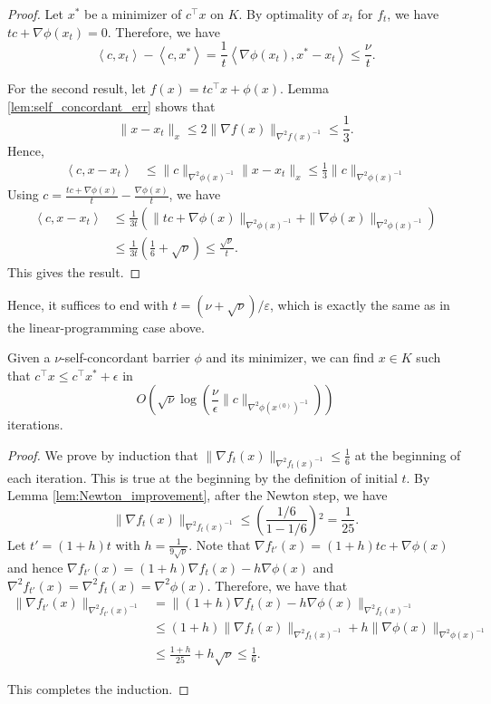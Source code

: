 \begin{proof}
Let $x^{*}$ be a minimizer of $c^{\top}x$ on $K$. By optimality
of $x_{t}$ for $f_{t}$, we have $tc+\nabla\phi(x_{t})=0$. Therefore,
we have 
\[
\left\langle c,x_{t}\right\rangle -\left\langle c,x^{*}\right\rangle =\frac{1}{t}\left\langle \nabla\phi(x_{t}),x^{*}-x_{t}\right\rangle \leq\frac{\nu}{t}.
\]

For the second result, let $f(x)=tc^{\top}x+\phi(x)$. Lemma \ref{lem:self_concordant_err}
shows that
\[
\|x-x_{t}\|_{x}\leq2\|\nabla f(x)\|_{\nabla^{2}f(x)^{-1}}\leq\frac{1}{3}.
\]
Hence,
\begin{align*}
\left\langle c,x-x_{t}\right\rangle  & \leq\|c\|_{\nabla^{2}\phi(x)^{-1}}\|x-x_{t}\|_{x}\leq\frac{1}{3}\|c\|_{\nabla^{2}\phi(x)^{-1}}
\end{align*}
Using $c=\frac{tc+\nabla\phi(x)}{t}-\frac{\nabla\phi(x)}{t}$, we
have
\begin{align*}
\left\langle c,x-x_{t}\right\rangle  & \leq\frac{1}{3t}\left(\|tc+\nabla\phi(x)\|_{\nabla^{2}\phi(x)^{-1}}+\|\nabla\phi(x)\|_{\nabla^{2}\phi(x)^{-1}}\right)\\
 & \leq\frac{1}{3t}\left(\frac{1}{6}+\sqrt{\nu}\right)\leq\frac{\sqrt{\nu}}{t}.
\end{align*}
This gives the result.
\end{proof}
Hence, it suffices to end with $t=(\nu+\sqrt{\nu})/\varepsilon$,
which is exactly the same as in the linear-programming case above.
\begin{thm}
Given a $\nu$-self-concordant barrier $\phi$ and its minimizer,
we can find $x\in K$ such that $c^{\top}x\leq c^{\top}x^{*}+\epsilon$
in 
\[
O(\sqrt{\nu}\log(\frac{\nu}{\epsilon}\|c\|_{\nabla^{2}\phi(x^{(0)})^{-1}}))
\]
iterations.
\end{thm}

\begin{proof}
We prove by induction that $\|\nabla f_{t}(x)\|_{\nabla^{2}f_{t}(x)^{-1}}\leq\frac{1}{6}$
at the beginning of each iteration. This is true at the beginning
by the definition of initial $t$. By Lemma \ref{lem:Newton_improvement},
after the Newton step, we have
\[
\|\nabla f_{t}(x)\|_{\nabla^{2}f_{t}(x)^{-1}}\leq\left(\frac{1/6}{1-1/6}\right){}^{2}=\frac{1}{25}.
\]
Let $t'=(1+h)t$ with $h=\frac{1}{9\sqrt{\nu}}$. Note that $\nabla f_{t'}(x)=(1+h)tc+\nabla\phi(x)$
and hence $\nabla f_{t'}(x)=(1+h)\nabla f_{t}(x)-h\nabla\phi(x)$
and $\nabla^{2}f_{t'}(x)=\nabla^{2}f_{t}(x)=\nabla^{2}\phi(x).$ Therefore,
we have that
\begin{align*}
\|\nabla f_{t'}(x)\|_{\nabla^{2}f_{t'}(x)^{-1}} & =\|(1+h)\nabla f_{t}(x)-h\nabla\phi(x)\|_{\nabla^{2}f_{t}(x)^{-1}}\\
 & \leq(1+h)\|\nabla f_{t}(x)\|_{\nabla^{2}f_{t}(x)^{-1}}+h\|\nabla\phi(x)\|_{\nabla^{2}\phi(x)^{-1}}\\
 & \leq\frac{1+h}{25}+h\sqrt{\nu}\leq\frac{1}{6}.
\end{align*}

This completes the induction.
\end{proof}

